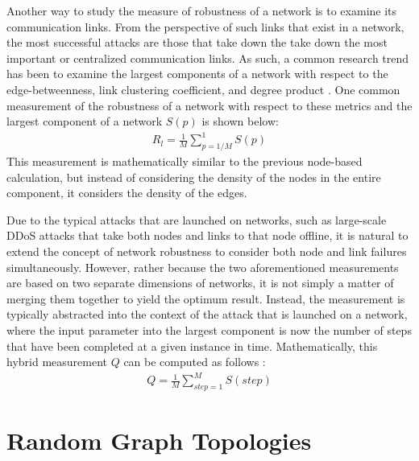 \documentclass[doc]{apa}%
\begin{document}

Another way to study the measure of robustness of a network is to examine its communication links. From the perspective of such links that exist in a network, the most successful attacks are those that take down the take down the most important or centralized communication links. As such, a common research trend has been to examine the largest components of a network with respect to the edge-betweenness, link clustering coefficient, and degree product \cite{NRMalicious}. One common measurement of the robustness of a network with respect to these metrics and the largest component of a network $S(p)$ is shown below:
\begin{eqnarray*}
R_l = \frac{1}{M}\sum_{p = 1/M}^{1}S(p)
\end{eqnarray*}
This measurement is mathematically similar to the previous node-based calculation, but instead of considering the density of the nodes in the entire component, it considers the density of the edges. 

Due to the typical attacks that are launched on networks, such as large-scale DDoS attacks that take both nodes and links to that node offline, it is natural to extend the concept of network robustness to consider both node and link failures simultaneously. However, rather because the two aforementioned measurements are based on two separate dimensions of networks, it is not simply a matter of merging them together to yield the optimum result. Instead, the measurement is typically abstracted into the context of the attack that is launched on a network, where the input parameter into the largest component is now the number of steps that have been completed at a given instance in time. Mathematically, this hybrid measurement $Q$ can be computed as follows \cite{NRMalicious}:
\begin{eqnarray*}
Q = \frac{1}{M}\sum_{step  = 1}^{M}S(step)
\end{eqnarray*}

\section{Random Graph Topologies}

\end{document}
